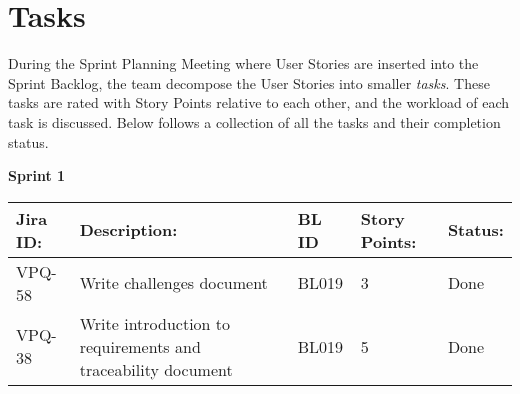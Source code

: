 \chapter{Tasks}
\label{app:tasks}
During the Sprint Planning Meeting where User Stories are inserted into the Sprint Backlog, the team decompose the User Stories into smaller \textit{tasks}. These tasks are rated with Story Points relative to each other, and the workload of each task is discussed. Below follows a collection of all the tasks and their completion status.  

\vspace*{1cm}

\begin{table}[ht]
\centering\textbf{Sprint 1}
\begin{tabularx}{\linewidth}{|m{1.5cm} m{6.65cm} m{1.2cm} m{1.5cm} m{3.5cm}|}
\hline
    \rowcolor{cadetgrey} 
     \textbf{Jira ID:} & \textbf{Description:} & \textbf{BL ID} & \textbf{Story Points:} & \textbf{Status: } \\ \hline
      VPQ-58 & Write challenges document & BL019 & 3\centering & Done \\ 
\rowcolor{gainsboro} VPQ-38 & Write introduction to requirements and traceability document & BL019 & 5\centering & Done  \\


\end{tabularx}
\end{table}
